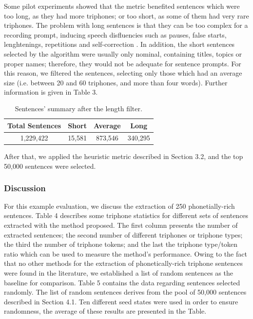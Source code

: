 Some pilot experiments showed that the metric benefited sentences which were too long, as they had more 
triphones; or too short, as some of them had very rare triphones. The problem with long sentences is that they
can be too complex for a recording prompt, inducing speech disfluencies such as pauses, false starts, 
lenghtenings, repetitions and self-correction \cite{Watanabe2012}. In addition, the short sentences selected by
the algorithm were usually only nominal, containing titles, topics or proper names; therefore, they would
not be adequate for sentence prompts. For this reason, we filtered the sentences, selecting only those which had
an average size (i.e. between 20 and 60 triphones, and more than four words). Further information is given in Table 3.

\begin{table}[H]
\begin{center}
\begin{tabular}{|c|c|c|c|}
\hline
\textbf{Total Sentences} & \textbf{Short} & \textbf{Average} & \textbf{Long} \\ \hline
1,229,422 & 15,581 & 873,546 & 340,295 \\ \hline
\end{tabular}
\end{center}
\caption{\label{filtered-sent} Sentences' summary after the length filter.}
\end{table}

After that, we applied the heuristic metric described in Section 3.2, and the top 50,000 sentences were selected.

\clearpage
\subsubsection{Discussion}

For this example evaluation, we discuss the extraction of 250 phonetially-rich sentences. Table 4 describes some triphone statistics for different sets of sentences extracted with the method proposed. The first column presents the number of extracted sentences; the second number of different triphones or triphone types; the third the number of triphone tokens; and the last the triphone type/token ratio which can be used to measure the method's performance. 
Owing to the fact that no other methods for the extraction of phonetically-rich triphone sentences were found in the literature,
we established a list of random sentences as the baseline for comparison. Table 5 contains the data regarding sentences selected randomly. The list of random sentences derives from the pool of 
50,000 sentences described in Section 4.1. Ten different seed states were used in order to ensure
randomness, the average of these results are presented in the Table. 

